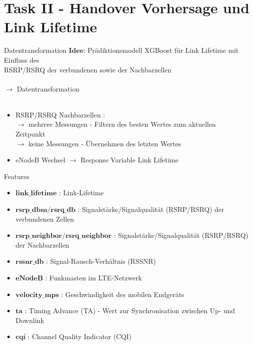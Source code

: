 \section{Task II - Handover Vorhersage und Link Lifetime}


\begin{frame}{Datentransformation}
$\textbf{Idee}$: Prädiktionsmodell XGBoost für Link Lifetime mit Einfluss des \\
 \hspace{9mm} RSRP/RSRQ der verbundenen sowie der Nachbarzellen \\

\quad\\

$\rightarrow$ Datentransformation\\

\quad\\

	\begin{itemize}
		\item RSRP/RSRQ Nachbarzellen : \\
		$\rightarrow$ mehrere Messungen - Filtern des besten Wertes zum aktuellen \\
		\hspace{4mm} Zeitpunkt \\
		$\rightarrow$ keine Messungen - Übernehmen des letzten Wertes \\
		\item eNodeB Wechsel $\rightarrow$ Response Variable Link Lifetime
	\end{itemize} 
\end{frame}





\begin{frame}{Features}
	\begin{itemize}
		\item $\textbf{link\_lifetime}$ : Link-Lifetime
		\item $\textbf{rsrp\_dbm/rsrq\_db}$ : Signalstärke/Signalqualität (RSRP/RSRQ) der verbundenen Zellen
		\item $\textbf{rsrp\_neighbor/rsrq\_neighbor}$ : Signalstärke/Signalqualität (RSRP/RSRQ) der Nachbarzellen
		\item $\textbf{rssnr\_db}$ : Signal-Rausch-Verhältnis (RSSNR)
		\item $\textbf{eNodeB}$ : Funkmasten im LTE-Netzwerk
		\item $\textbf{velocity\_mps}$ : Geschwindigkeit des mobilen Endgeräts
		\item $\textbf{ta}$ : Timing Advance (TA) - Wert zur Synchronisation zwischen Up- und Downlink 
		\item $\textbf{cqi}$ : Channel Quality Indicator (CQI) 
	\end{itemize}
\end{frame}





